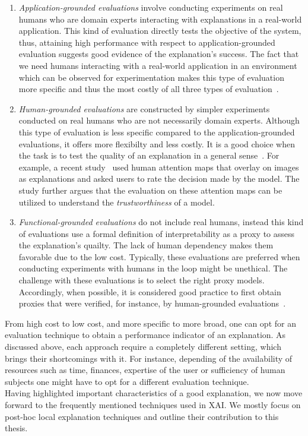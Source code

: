 \begin{enumerate}
    \item \emph{Application-grounded evaluations} involve conducting experiments on real humans who are domain experts interacting with explanations in a real-world application. This kind of evaluation directly tests the objective of the system, thus, attaining high performance with respect to application-grounded evaluation suggests good evidence of the explanation's success. The fact that we need humans interacting with a real-world application in an environment which can be observed for experimentation makes this type of evaluation more specific and thus the most costly of all three types of evaluation~\parencite{TowardsARigorousScienceML_Velez}.
    \item \emph{Human-grounded evaluations} are constructed by simpler experiments conducted on real humans who are not necessarily domain experts. Although this type of evaluation is less specific compared to the application-grounded evaluations, it offers more flexibilty and less costly. It is a good choice when the task is to test the quality of an explanation in a general sense~\parencite{TowardsARigorousScienceML_Velez}. For example, a recent study~\parencite{AHumanGroundedEvaluationBenchmark_Mohseni} used human attention maps that overlay on images as explanations and asked users to rate the decision made by the model. The study further argues that the evaluation on these attention maps can be utilized to understand the \emph{trustworthiness} of a model.
    \item \emph{Functional-grounded evaluations} do not include real humans, instead this kind of evaluations use a formal definition of interpretability as a proxy to assess the explanation's quailty. The lack of human dependency makes them favorable due to the low cost. Typically, these evaluations are preferred when conducting experiments with humans in the loop might be unethical. The challenge with these evaluations is to select the right proxy models. Accordingly, when possible, it is considered good practice to first obtain proxies that were verified, for instance, by human-grounded evaluations~\parencite{TowardsARigorousScienceML_Velez}.
\end{enumerate}
From high cost to low cost, and more specific to more broad, one can opt for an evaluation technique to obtain a performance indicator of an explanation. As discussed above, each approach require a completely different setting, which brings their shortcomings with it. For instance, depending of the availability of resources such as time, finances, expertise of the user or sufficiency of human subjects one might have to opt for a different evaluation technique.\\
Having highlighted important characteristics of a good explanation, we now move forward to the frequently mentioned techniques used in XAI. We mostly focus on post-hoc local explanation techniques and outline their contribution to this thesis.

